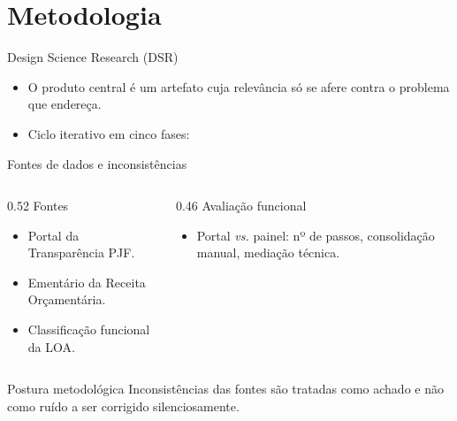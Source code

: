 \documentclass[aspectratio=169]{beamer}
\begin{document}
\section{Metodologia}
\begin{frame}{Design Science Research (DSR)~\citep{hevner2004,dresch2015}}
  \begin{itemize}
    \item O produto central é um artefato cuja relevância só se afere contra o problema que endereça.
    \item Ciclo iterativo em cinco fases:
  \end{itemize}
  \vspace{0.2cm}
  \begin{center}
  \footnotesize
  \end{center}
\end{frame}

\begin{frame}{Fontes de dados e inconsistências}
  \begin{columns}[T]
    \begin{column}{0.52\textwidth}
      Fontes
      \begin{itemize}\small
        \item Portal da Transparência PJF.
        \item Ementário da Receita Orçamentária.
        \item Classificação funcional da LOA.
      \end{itemize}
    \end{column}
    \begin{column}{0.46\textwidth}
      Avaliação funcional
      \begin{itemize}\small
        \item Portal \textit{vs.} painel: nº de passos, consolidação manual, mediação técnica.
      \end{itemize}
    \end{column}
  \end{columns}
  \vspace{0.2cm}
  \begin{block}{Postura metodológica}
    Inconsistências das fontes são tratadas como achado e não como ruído a ser corrigido silenciosamente.
  \end{block}
\end{frame}
\end{document}
